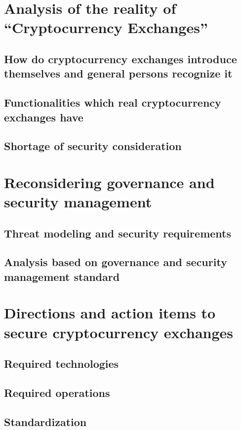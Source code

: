 \documentclass[english]{llncs}
\begin{document}
\section{Analysis of the reality of ``Cryptocurrency Exchanges''}
\subsection{How do cryptocurrency exchanges introduce themselves and general persons recognize it}
\subsection{Functionalities which real cryptocurrency exchanges have}
\subsection{Shortage of security consideration}






\section{Reconsidering governance and security management}
\subsection{Threat modeling and security requirements}
\subsection{Analysis based on governance and security management standard}




\section{Directions and action items to secure cryptocurrency exchanges}
\subsection{Required technologies}
\subsection{Required operations}
\subsection{Standardization}
\end{document}
